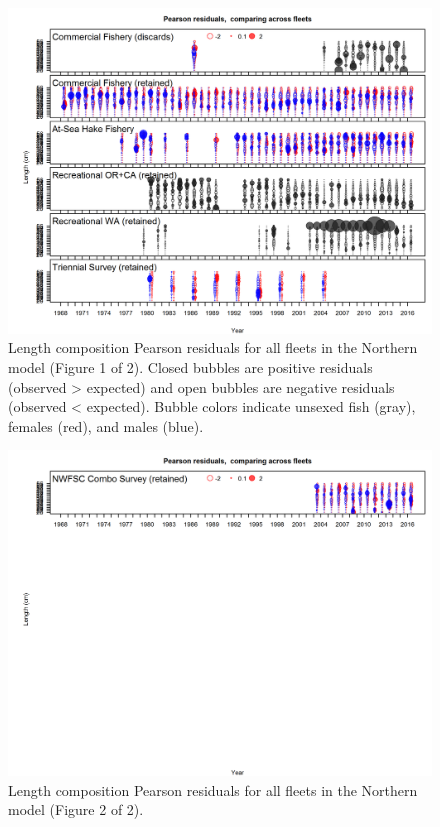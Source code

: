 \documentclass[12pt,]{article}
\begin{document}
\begin{figure}[htbp]
\centering
\includegraphics{r4ss/plots_mod1/comp_lenfit__page1_multi-fleet_comparison.png}
\caption{Length composition Pearson residuals for all fleets in the
Northern model (Figure 1 of 2). Closed bubbles are positive residuals
(observed \textgreater{} expected) and open bubbles are negative
residuals (observed \textless{} expected). Bubble colors indicate
unsexed fish (gray), females (red), and males
(blue).\label{fig:comp_Pearson_length_mod1_page1}}
\end{figure}

\begin{figure}[htbp]
\centering
\includegraphics{r4ss/plots_mod1/comp_lenfit__page2_multi-fleet_comparison.png}
\caption{Length composition Pearson residuals for all fleets in the
Northern model (Figure 2 of
2).\label{fig:comp_Pearson_length_mod1_page2}}
\end{figure}
\end{document}

